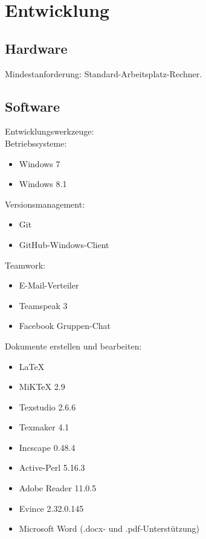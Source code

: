\chapter{Entwicklung}

\section{Hardware}


Mindestanforderung: Standard-Arbeitsplatz-Rechner.


\section{Software}

Entwicklungswerkzeuge:\\

Betriebssysteme:

\begin{itemize}

\item Windows 7
\item Windows 8.1

\end{itemize}

Versionsmanagement:

\begin{itemize}

\item Git
\item GitHub-Windows-Client

\end{itemize}

Teamwork:

\begin{itemize}

\item E-Mail-Verteiler
\item Teamspeak 3
\item Facebook Gruppen-Chat

\end{itemize}

Dokumente erstellen und bearbeiten:

\begin{itemize}

\item LaTeX

\item MiKTeX 2.9
\item Texstudio 2.6.6
\item Texmaker 4.1
\item Incscape 0.48.4 
\item Active-Perl 5.16.3
\item Adobe Reader 11.0.5
\item Evince 2.32.0.145

\item Microsoft Word (.docx- und .pdf-Unterstützung)

\end{itemize}

